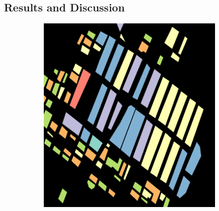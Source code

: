 \subsection{Results and Discussion}
\begin{figure}[t]
\centering
    \begin{subfigure}[b]{0.24\textwidth}
        \includegraphics[width=\textwidth]{Figures/Kron/Validation_COLOUR}
        \caption{}
        \label{fig:Training}
    \end{subfigure}
     \begin{subfigure}[b]{0.24\textwidth}

\end{subfigure}
\end{figure}

